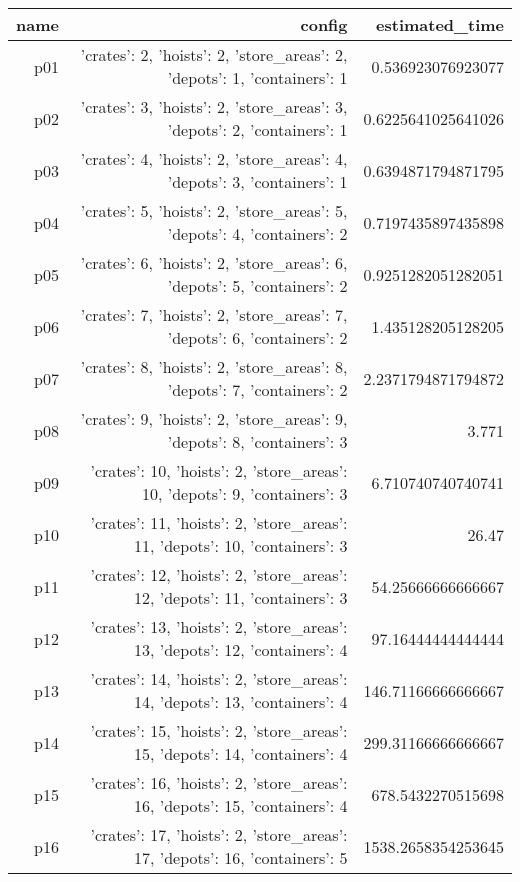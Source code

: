 \documentclass{article}
\begin{document}
                            \begin{center}
                            \scriptsize
                            \begin{tabular}{r|r|r}
                            name & config & estimated\_time\\\midrule
                              p01&{'crates': 2, 'hoists': 2, 'store\_areas': 2, 'depots': 1, 'containers': 1}&0.536923076923077\\
  p02&{'crates': 3, 'hoists': 2, 'store\_areas': 3, 'depots': 2, 'containers': 1}&0.6225641025641026\\
  p03&{'crates': 4, 'hoists': 2, 'store\_areas': 4, 'depots': 3, 'containers': 1}&0.6394871794871795\\
  p04&{'crates': 5, 'hoists': 2, 'store\_areas': 5, 'depots': 4, 'containers': 2}&0.7197435897435898\\
  p05&{'crates': 6, 'hoists': 2, 'store\_areas': 6, 'depots': 5, 'containers': 2}&0.9251282051282051\\
  p06&{'crates': 7, 'hoists': 2, 'store\_areas': 7, 'depots': 6, 'containers': 2}&1.435128205128205\\
  p07&{'crates': 8, 'hoists': 2, 'store\_areas': 8, 'depots': 7, 'containers': 2}&2.2371794871794872\\
  p08&{'crates': 9, 'hoists': 2, 'store\_areas': 9, 'depots': 8, 'containers': 3}&3.771\\
  p09&{'crates': 10, 'hoists': 2, 'store\_areas': 10, 'depots': 9, 'containers': 3}&6.710740740740741\\
  p10&{'crates': 11, 'hoists': 2, 'store\_areas': 11, 'depots': 10, 'containers': 3}&26.47\\
  p11&{'crates': 12, 'hoists': 2, 'store\_areas': 12, 'depots': 11, 'containers': 3}&54.25666666666667\\
  p12&{'crates': 13, 'hoists': 2, 'store\_areas': 13, 'depots': 12, 'containers': 4}&97.16444444444444\\
  p13&{'crates': 14, 'hoists': 2, 'store\_areas': 14, 'depots': 13, 'containers': 4}&146.71166666666667\\
  p14&{'crates': 15, 'hoists': 2, 'store\_areas': 15, 'depots': 14, 'containers': 4}&299.31166666666667\\
  p15&{'crates': 16, 'hoists': 2, 'store\_areas': 16, 'depots': 15, 'containers': 4}&678.5432270515698\\
  p16&{'crates': 17, 'hoists': 2, 'store\_areas': 17, 'depots': 16, 'containers': 5}&1538.2658354253645\\

\end{tabular}
\end{center}
\end{document}
